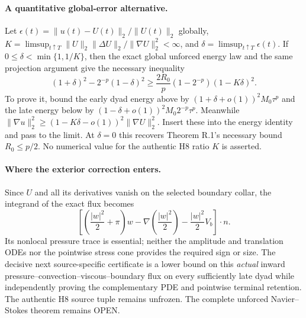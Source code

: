 \paragraph{A quantitative global-error alternative.}
Let $\epsilon(t)=\|u(t)-U(t)\|_2/\|U(t)\|_2$ globally,
$K=\limsup_{t\uparrow T}
 \|U\|_2\|\Delta U\|_2/\|\nabla U\|_2^2<\infty$,
and $\delta=\limsup_{t\uparrow T}\epsilon(t)$.
If $0\le\delta<\min\{1,1/K\}$, then the exact
global unforced energy law and the same projection argument give
the necessary inequality
\begin{equation}\label{eq:T-global-delta}
 \boxed{(1+\delta)^2-2^{-p}(1-\delta)^2
 \ge \frac{2R_0}{p}(1-2^{-p})(1-K\delta)^2.}
\end{equation}
To prove it, bound the early dyad energy above by
$(1+\delta+o(1))^2M_0\tau^p$ and the late energy
below by $(1-\delta+o(1))^2M_0 2^{-p}\tau^p$.
Meanwhile $\|\nabla u\|_2^2\ge
(1-K\delta-o(1))^2\|\nabla U\|_2^2$.
Insert these into the energy identity and pass to the limit.
At $\delta=0$ this recovers Theorem R.1's
necessary bound $R_0\le p/2$.
No numerical value for the authentic H8 ratio $K$ is asserted.

\paragraph{Where the exterior correction enters.}
Since $U$ and all its derivatives vanish on the selected
boundary collar, the integrand of the exact flux becomes
\[
 \left[\left(\frac{|w|^2}{2}+\pi\right)w
 -\nabla\left(\frac{|w|^2}{2}\right)
 -\frac{|w|^2}{2}V_b\right]\cdot n.
\]
Its nonlocal pressure trace is essential; neither the
amplitude and translation ODEs nor the pointwise stress cone
provides the required sign or size.
The decisive next source-specific certificate is a lower bound
on this \emph{actual} inward pressure--convection--viscous--boundary
flux on every sufficiently late dyad while independently proving
the complementary PDE and pointwise terminal retention.
The authentic H8 source tuple remains unfrozen.
The complete unforced Navier--Stokes theorem remains OPEN.

